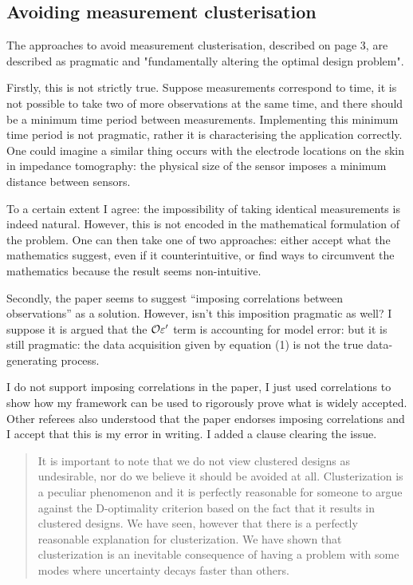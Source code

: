 \subsection{Avoiding measurement clusterisation}
\RC The approaches to avoid measurement clusterisation, described on page
3, are described as pragmatic and "fundamentally altering the optimal
design problem".

\RC Firstly, this is not strictly true. Suppose measurements correspond to
time, it is not possible to take two of more observations at the same
time, and there should be a minimum time period between measurements.
Implementing this minimum time period is not pragmatic, rather it is
characterising the application correctly. One could imagine a similar
thing occurs with the electrode locations on the skin in impedance
tomography: the physical size of the sensor imposes a minimum
distance between sensors.

\AR To a certain extent I agree: the impossibility of taking identical
measurements is indeed natural. However, this is not encoded in the
mathematical formulation of the problem. One can then take one of two
approaches: either accept what the mathematics suggest, even if it
counterintuitive, or find ways to circumvent the mathematics because
the result seems non-intuitive.


\RC Secondly, the paper seems to suggest “imposing correlations
between observations” as a solution. However, isn’t this imposition
pragmatic as well? I suppose it is argued that the $\mathcal{O} \varepsilon'$ term
is accounting for model error: but it is still pragmatic: the data
acquisition given by equation (1) is not the true data-generating
process.

\AR I do not support imposing correlations in the paper, I just
used correlations to show how my framework can be used to rigorously
prove what is widely accepted. Other referees also understood that the
paper endorses imposing correlations and I accept that this is my
error in writing. I added a clause clearing the issue.


\begin{quote}
  It is important to note that we do not view clustered designs as
  undesirable, nor do we believe it should be avoided at
  all. Clusterization is a peculiar phenomenon and it is perfectly
  reasonable for someone to argue against the D-optimality criterion
  based on the fact that it results in clustered designs. We have
  seen, however that there is a perfectly reasonable explanation for
  clusterization. We have shown that clusterization is an inevitable
  consequence of having a problem with some modes where uncertainty
  decays faster than others.
\end{quote}


